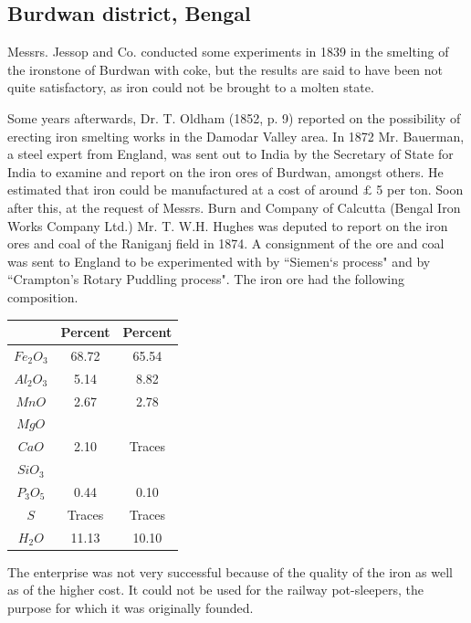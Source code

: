 \vspace{-.3cm}

\subsection*{Burdwan district, Bengal}

\vspace{-.2cm}

Messrs. Jessop and Co. conducted some experiments in 1839 in the smelting of the ironstone of Burdwan with coke, but the results are said to have been not quite satisfactory, as iron could not be brought to a molten state. 

Some years afterwards, Dr. T. Oldham (1852, p. 9) reported on the possibility of erecting iron smelting works in the Damodar Valley area. In 1872 Mr. Bauerman, a steel expert from England, was sent out to India by the Secretary of State for India to examine and report on the iron ores of Burdwan, amongst others. He estimated that iron could be manufactured at a cost of around $£$ 5 per ton.  Soon after this, at the request of Messrs. Burn and Company of Calcutta (Bengal Iron Works Company Ltd.) Mr. T. W.H. Hughes was deputed to report on the iron ores and coal of the Raniganj field in 1874.  A consignment of the ore and coal was sent to England to be experimented with by ``Siemen`s process" and by ``Crampton's Rotary Puddling process".  The iron ore had the following composition.


{\fontsize{8}{10}\selectfont
\begin{center}
\begin{tabular}{|c|c|c|}
\hline
 & Percent & Percent\\\hline
$Fe_2O_3$ & 68.72 & 65.54\\ \hline
$Al_2O_3$ & 5.14 & 8.82\\ \hline
$MnO$ & 2.67 & 2.78\\ \hline
$MgO$ & & \\
$CaO$ & 2.10 & Traces\\ 
$SiO_3$ & & \\ \hline
$P_3O_5$ & 0.44 & 0.10\\ \hline
$S$ & Traces & Traces \\ \hline
$H_2O$ & 11.13 & 10.10\\ \hline
\end{tabular}
\end{center}
}

The enterprise was not very successful because of the quality of the iron as well as of the higher cost.  It could not be used for the railway pot-sleepers, the purpose for which it was originally founded.

